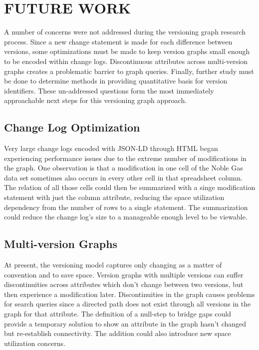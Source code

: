 
\chapter{FUTURE WORK}\label{ch:future}

A number of concerns were not addressed during the versioning graph research process.
Since a new change statement is made for each difference between versions, some optimizations must be made to keep version graphs small enough to be encoded within change logs.
Discontinuous attributes across multi-version graphs creates a problematic barrier to graph queries.
Finally, further study must be done to determine methods in providing quantitative basis for version identifiers.
These un-addressed questions form the most immediately approachable next steps for this versioning graph approach.

\section{Change Log Optimization}

Very large change logs encoded with JSON-LD through HTML began experiencing performance issues due to the extreme number of modifications in the graph.
One observation is that a modification in one cell of the Noble Gas data set sometimes also occurs in every other cell in that spreadsheet column.
The relation of all those cells could then be summarized with a singe modification statement with just the column attribute, reducing the space utilization dependency from the number of rows to a single statement.
The summarization could reduce the change log's size to a manageable enough level to be viewable.

\section{Multi-version Graphs}

At present, the versioning model captures only changing as a matter of convention and to save space.
Version graphs with multiple versions can suffer discontinuities across attributes which don't change between two versions, but then experience a modification later.
Discontinuities in the graph causes problems for search queries since a directed path does not exist through all versions in the graph for that attribute.
The definition of a null-step to bridge gaps could provide a temporary solution to show an attribute in the graph hasn't changed but re-establish connectivity.
The addition could also introduce new space utilization concerns.


